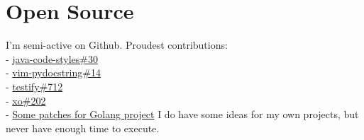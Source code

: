 \section*{Open Source}
{ %
  I'm semi-active on Github. Proudest contributions: \\
  - \href{https://github.com/square/java-code-styles/pull/30}{java-code-styles\#30} \\
  - \href{https://github.com/heavenshell/vim-pydocstring/pull/14}{vim-pydocstring\#14} \\
  - \href{https://github.com/stretchr/testify/pull/712}{testify\#712}\\
  - \href{https://github.com/xo/xo/pull/202}{xo\#202} \\
  - \href{https://go-review.googlesource.com/q/owner:letientai299}{Some patches for Golang project}
  \break
  \break
  I do have some ideas for my own projects, but never have enough time to
  execute.
}
